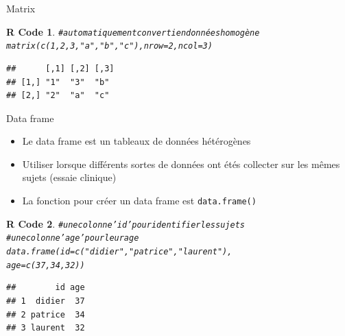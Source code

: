 \documentclass[11pt]{beamer}\usepackage[]{graphicx}\usepackage[]{color}
\makeatletter
\newcommand{\hlnum}[1]{\textcolor[rgb]{0.063,0.58,0.627}{#1}}%
\newcommand{\hlstr}[1]{\textcolor[rgb]{0.063,0.58,0.627}{#1}}%
\newcommand{\hlcom}[1]{\textcolor[rgb]{0.588,0.588,0.588}{#1}}%
\newcommand{\hlstd}[1]{\textcolor[rgb]{0.196,0.196,0.196}{#1}}%
\newcommand{\hlkwc}[1]{\textcolor[rgb]{0,0.631,0.314}{#1}}%
\newcommand{\hlkwd}[1]{\textcolor[rgb]{0.78,0.227,0.412}{#1}}%
\newenvironment{kframe}{%
 \def\at@end@of@kframe{}%
 \ifinner\ifhmode%
  \def\at@end@of@kframe{\end{minipage}}%
  \begin{minipage}{\columnwidth}%
 \fi\fi%
 \def\FrameCommand##1{\hskip\@totalleftmargin \hskip-\fboxsep
 \colorbox{shadecolor}{##1}\hskip-\fboxsep
     \hskip-\linewidth \hskip-\@totalleftmargin \hskip\columnwidth}%
 \MakeFramed {\advance\hsize-\width
   \@totalleftmargin\z@ \linewidth\hsize
   \@setminipage}}%
 {\par\unskip\endMakeFramed%
 \at@end@of@kframe}
\newenvironment{knitrout}{}{} %
\newtheorem{rcode}{R Code}[section]
\newcommand{\code}[1]{\texttt{#1}}
\makeatother
\begin{document}
\begin{frame}[fragile]{Matrix}

\begin{knitrout}
\color{fgcolor}\begin{kframe}
\begin{rcode}\begin{alltt}
\hlcom{# automatiquement converti en données homogène}
\hlkwd{matrix}\hlstd{(}\hlkwd{c}\hlstd{(}\hlnum{1}\hlstd{,}\hlnum{2}\hlstd{,}\hlnum{3}\hlstd{,}\hlstr{"a"}\hlstd{,}\hlstr{"b"}\hlstd{,}\hlstr{"c"}\hlstd{),} \hlkwc{nrow} \hlstd{=} \hlnum{2}\hlstd{,} \hlkwc{ncol} \hlstd{=} \hlnum{3}\hlstd{)}
\end{alltt}
\begin{verbatim}
##      [,1] [,2] [,3]
## [1,] "1"  "3"  "b" 
## [2,] "2"  "a"  "c"
\end{verbatim}
\end{rcode}\end{kframe}
\end{knitrout}

\end{frame}





\begin{frame}[fragile]{Data frame}

\begin{itemize}
  \setlength\itemsep{0.5em}
\item Le data frame est un tableaux de données hétérogènes
\pause \item Utiliser lorsque différents sortes de données ont étés collecter sur les m\^{e}mes sujets (essaie clinique) 
\pause \item La fonction pour créer un data frame est \code{data.frame()}
\end{itemize}
\pause
\begin{knitrout}
\color{fgcolor}\begin{kframe}
\begin{rcode}\begin{alltt}
\hlcom{# une colonne 'id' pour identifier les sujets}
\hlcom{# une colonne 'age' pour leur age}
\hlkwd{data.frame}\hlstd{(}\hlkwc{id} \hlstd{=} \hlkwd{c}\hlstd{(}\hlstr{"didier"}\hlstd{,}\hlstr{"patrice"}\hlstd{,}\hlstr{"laurent"}\hlstd{),}
           \hlkwc{age} \hlstd{=} \hlkwd{c}\hlstd{(}\hlnum{37}\hlstd{,}\hlnum{34}\hlstd{,}\hlnum{32}\hlstd{))}
\end{alltt}
\begin{verbatim}
##        id age
## 1  didier  37
## 2 patrice  34
## 3 laurent  32
\end{verbatim}
\end{rcode}\end{kframe}
\end{knitrout}

\end{frame}
\end{document}
